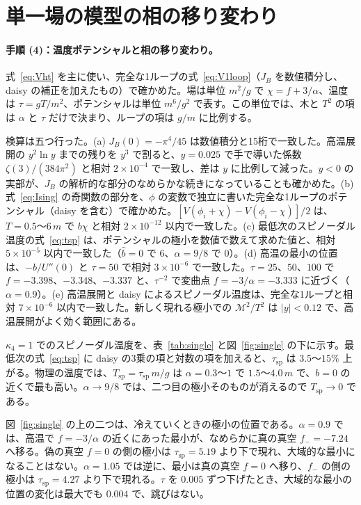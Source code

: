 \documentclass[a4paper,10pt]{ltjsarticle}
\begin{document}
\FloatBarrier
\section{単一場の模型の相の移り変わり}\label{sec:single}

\paragraph{手順 (4)：温度ポテンシャルと相の移り変わり。}式~\eqref{eq:Vht} を主に使い、完全な1ループの式~\eqref{eq:V1loop}（$J_B$ を数値積分し、daisy の補正を加えたもの）で確かめた。場は単位 $m^2/g$ で $\chi=f+3/\alpha$、温度は $\tau=gT/m^2$、ポテンシャルは単位 $m^6/g^2$ で表す。この単位では、木と $T^2$ の項は $\alpha$ と $\tau$ だけで決まり、ループの項は $g/m$ に比例する。

検算は五つ行った。(a) $J_B(0)=-\pi^4/45$ は数値積分と15桁で一致した。高温展開の $y^2\ln y$ までの残りを $y^3$ で割ると、$y=0.025$ で手で導いた係数 $\zeta(3)/(384\pi^2)$ と相対 $2\times10^{-4}$ で一致し、差は $y$ に比例して減った。$y<0$ の実部が、$J_B$ の解析的な部分のなめらかな続きになっていることも確かめた。(b) 式~\eqref{eq:Ising} の奇関数の部分を、$\phi$ の変数で独立に書いた完全な1ループのポテンシャル（daisy を含む）で確かめた。$[V(\phi_i+\chi)-V(\phi_i-\chi)]/2$ は、$T=0.5$〜$6\,m$ で $b\chi$ と相対 $2\times10^{-12}$ 以内で一致した。(c) 最低次のスピノーダル温度の式~\eqref{eq:tsp} は、ポテンシャルの極小を数値で数えて求めた値と、相対 $5\times10^{-5}$ 以内で一致した（$\hat b=0$ で $6$、$\alpha=9/8$ で $0$）。(d) 高温の最小の位置は、$-b/U''(0)$ と $\tau=50$ で相対 $3\times10^{-6}$ で一致した。$\tau=25$、$50$、$100$ で $f=-3.398$、$-3.348$、$-3.337$ と、$\tau^{-2}$ で変曲点 $f=-3/\alpha=-3.333$ に近づく（$\alpha=0.9$）。(e) 高温展開と daisy によるスピノーダル温度は、完全な1ループと相対 $7\times10^{-6}$ 以内で一致した。新しく現れる極小での $\mathcal M^2/T^2$ は $|y|<0.12$ で、高温展開がよく効く範囲にある。

$\kappa_4=1$ でのスピノーダル温度を、表~\ref{tab:single} と図~\ref{fig:single} の下に示す。最低次の式~\eqref{eq:tsp} に daisy の3乗の項と対数の項を加えると、$\tau_{\mathrm{sp}}$ は $3.5$〜$15\%$ 上がる。物理の温度では、$T_{\mathrm{sp}}=\tau_{\mathrm{sp}}\,m/g$ は $\alpha=0.3$〜$1$ で $1.5$〜$4.0\,m$ で、$b=0$ の近くで最も高い。$\alpha\to9/8$ では、二つ目の極小そのものが消えるので $T_{\mathrm{sp}}\to0$ である。

図~\ref{fig:single} の上の二つは、冷えていくときの極小の位置である。$\alpha=0.9$ では、高温で $f=-3/\alpha$ の近くにあった最小が、なめらかに真の真空 $f_-=-7.24$ へ移る。偽の真空 $f=0$ の側の極小は $\tau_{\mathrm{sp}}=5.19$ より下で現れ、大域的な最小になることはない。$\alpha=1.05$ では逆に、最小は真の真空 $f=0$ へ移り、$f_-$ の側の極小は $\tau_{\mathrm{sp}}=4.27$ より下で現れる。$\tau$ を $0.005$ ずつ下げたとき、大域的な最小の位置の変化は最大でも $0.004$ で、跳びはない。
\end{document}
